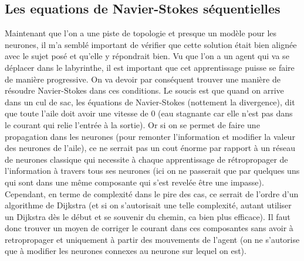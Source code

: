 \documentclass[12pt]{article}
\begin{document}
\subsection{Les equations de Navier-Stokes séquentielles}
Maintenant que l'on a une piste de topologie et presque un modèle pour les neurones, il m'a semblé important de vérifier que cette solution était bien alignée avec le sujet posé et qu'elle y répondrait bien. Vu que l'on a un agent qui va se déplacer dans le labyrinthe, il est important que cet apprentissage puisse se faire de manière progressive. On va devoir par conséquent trouver une manière de résoudre Navier-Stokes dans ces conditions. Le soucis est que quand on arrive dans un cul de sac, les équations de Navier-Stokes (nottement la divergence), dit que toute l'aile doit avoir une vitesse de 0 (eau stagnante car elle n'est pas dans le courant qui relie l'entrée à la sortie). Or si on se permet de faire une propagation dans les neurones (pour remonter l'information et modifier la valeur des neurones de l'aile), ce ne serrait pas un cout énorme par rapport à un réseau de neurones classique qui necessite à chaque apprentissage de rétropropager de l'information à travers tous ses neurones (ici on ne passerait que par quelques uns qui sont dans une même composante qui s'est revelée être une impasse). Cependant, en terme de complexité dans le pire des cas, ce serrait de l'ordre d'un algorithme de Dijkstra (et si on s'autorisait une telle complexité, autant utiliser un Dijkstra dès le début et se souvenir du chemin, ca bien plus efficace). Il faut donc trouver un moyen de corriger le courant dans ces composantes sans avoir à retropropager et uniquement à partir des mouvements de l'agent (on ne s'autorise que à modifier les neurones connexes au neurone sur lequel on est).
\end{document}
